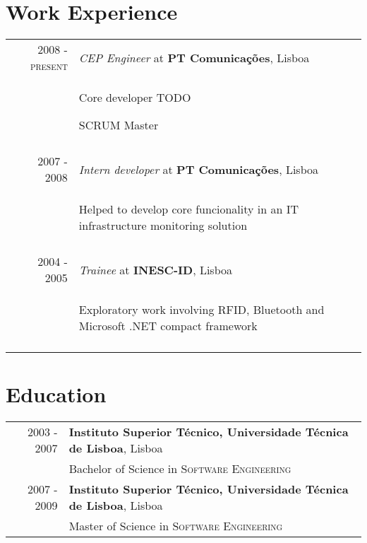 \documentclass[a4paper,10pt]{article}
\begin{document}
\section{Work Experience}
\begin{tabular}{rp{11cm}}
\textsc{2008 - present} & \emph{CEP Engineer} at \textbf{PT Comunicações}, Lisboa\\ 
   & \begin{compactitem} 
       \item Core developer TODO
       \item SCRUM Master
     \end{compactitem}\vspace{-1em} \\
\multicolumn{2}{c}{} \\

  \textsc{2007 - 2008} & \emph{Intern developer} at \textbf{PT Comunicações}, Lisboa\\ 
  & \begin{compactitem}
    \item Helped to develop core funcionality in an IT infrastructure monitoring solution
   \end{compactitem}\vspace{-1em} \\
\multicolumn{2}{c}{} \\

  \textsc{2004 - 2005} & \emph{Trainee} at \textbf{INESC-ID}, Lisboa\\ 
  & \begin{compactitem}
    \item Exploratory work involving RFID, Bluetooth and Microsoft .NET compact framework
   \end{compactitem}\vspace{-1em} \\
\multicolumn{2}{c}{} \\

\end{tabular}

\section{Education}
\begin{tabular}{rl}	
2003 - 2007 & \textbf{Instituto Superior Técnico, Universidade Técnica de Lisboa}, Lisboa\\
 & Bachelor of Science in \textsc{Software Engineering} \\
2007 - 2009 & \textbf{Instituto Superior Técnico, Universidade Técnica de Lisboa}, Lisboa\\
 & Master of Science in \textsc{Software Engineering}
\end{tabular}
\end{document}
